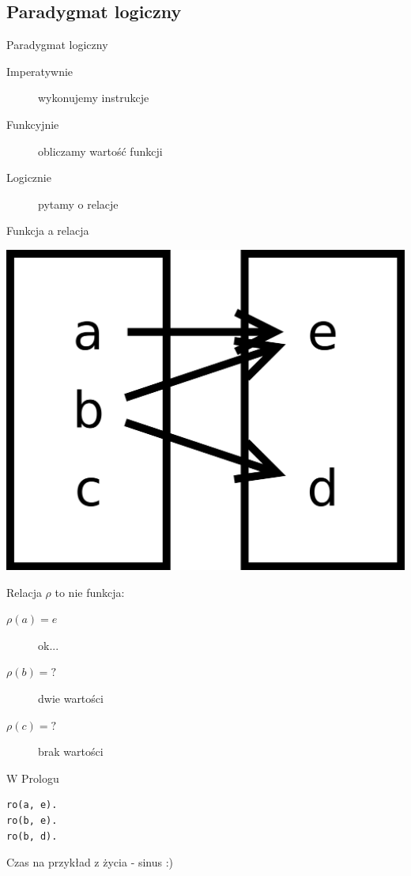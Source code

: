 \documentclass[blue]{beamer}
\begin{document}
\subsection{Paradygmat logiczny}
\begin{frame}{Paradygmat logiczny}
\begin{description}
\item[Imperatywnie] wykonujemy instrukcje
\item[Funkcyjnie] obliczamy wartość funkcji
\item[Logicznie] pytamy o relacje
\end{description}
\end{frame}
\begin{frame}{Funkcja a relacja}
\begin{center}
\includegraphics[height=0.4\textheight]{relacja.png}
\end{center}
Relacja $\rho$ to nie funkcja:
\begin{description}
\item[$\rho(a) = e$] ok...
\item[$\rho(b) = ?$] dwie wartości
\item[$\rho(c) = ?$] brak wartości
\end{description}
\end{frame}
\begin{frame}[fragile]{W Prologu}
\begin{lstlisting}
ro(a, e).
ro(b, e).
ro(b, d).
\end{lstlisting}
\end{frame}
\begin{frame}[fragile]{Czas na przykład z życia - sinus :)}

\end{frame}
\end{document}

